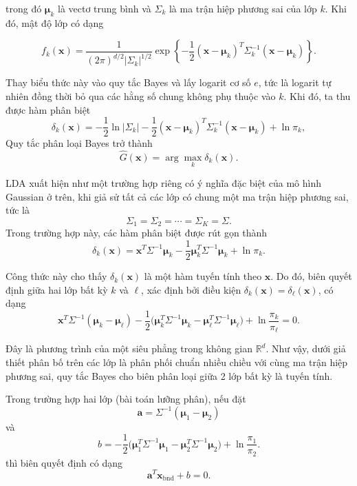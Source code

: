 trong đó $\bm{\mu}_k$ là vectơ trung bình và $\Sigma_k$ là ma trận hiệp phương sai của lớp $k$. Khi đó, mật độ lớp có dạng

\begin{equation}
f_k(\bm{x})=\frac{1}{(2\pi)^{d/2}|\Sigma_k|^{1/2}}
\exp\left\{-\frac12(\bm{x}-\bm{\mu}_k)^T\Sigma_k^{-1}(\bm{x}-\bm{\mu}_k)\right\}.
\end{equation}

Thay biểu thức này vào quy tắc Bayes và lấy logarit cơ số \(e\), tức là logarit tự nhiên đồng thời bỏ qua các hằng số chung không phụ thuộc vào $k$. Khi đó, ta thu được hàm phân biệt
\begin{equation}
\delta_k(\bm{x})= -\frac12\ln |\Sigma_k|
-\frac12(\bm{x}-\bm{\mu}_k)^T\Sigma_k^{-1}(\bm{x}-\bm{\mu}_k)
+\ln \pi_k,
\end{equation}
Quy tắc phân loại Bayes trở thành
\begin{equation}
\widehat{G}(\bm{x})=\arg\max_k \delta_k(\bm{x}).
\end{equation}

\hspace*{0.5cm}LDA xuất hiện như một trường hợp riêng có ý nghĩa đặc biệt của mô hình Gaussian ở trên, khi giả sử tất cả các lớp có chung một ma trận hiệp phương sai, tức là
\[
\Sigma_1=\Sigma_2=\cdots=\Sigma_K=\Sigma.
\]
Trong trường hợp này, các hàm phân biệt được rút gọn thành
\begin{equation}
	\delta_k(\bm{x})=\bm{x}^T\Sigma^{-1}\bm{\mu}_k-\frac12\bm{\mu}_k^T\Sigma^{-1}\bm{\mu}_k+\ln \pi_k.
\end{equation}

Công thức này cho thấy $\delta_k(\bm{x})$ là một hàm tuyến tính theo $\bm{x}$. Do đó, biên quyết định giữa hai lớp bất kỳ $k$ và $\ell$, xác định bởi điều kiện $\delta_k(\bm{x})=\delta_\ell(\bm{x})$, có dạng
\begin{equation}
	\bm{x}^T\Sigma^{-1}(\bm{\mu}_k-\bm{\mu}_\ell)
	-\frac12\bigl(\bm{\mu}_k^T\Sigma^{-1}\bm{\mu}_k-\bm{\mu}_\ell^T\Sigma^{-1}\bm{\mu}_\ell\bigr)
	+\ln\frac{\pi_k}{\pi_\ell}=0.
\end{equation}

Đây là phương trình của một siêu phẳng trong không gian $\mathbb{R}^d$. Như vậy, dưới giả thiết phân bố trên các lớp là phân phối chuẩn nhiều chiều với cùng ma trận hiệp phương sai, quy tắc Bayes cho biên phân loại giữa 2 lớp bất kỳ là tuyến tính.

Trong trường hợp hai lớp (bài toán lưỡng phân), nếu đặt
\[
\bm{a}
=
\Sigma^{-1}(\bm{\mu}_1-\bm{\mu}_2)
\]
và
\[
b
=
-\frac12
\bigl(
\bm{\mu}_1^T\Sigma^{-1}\bm{\mu}_1
-
\bm{\mu}_2^T\Sigma^{-1}\bm{\mu}_2
\bigr)
+
\ln\frac{\pi_1}{\pi_2}.
\]
thì biên quyết định có dạng
\begin{equation}
	\bm{a}^T\bm{x}_\text{bnd}+b=0.
	\label{eq:ni}
\end{equation}

